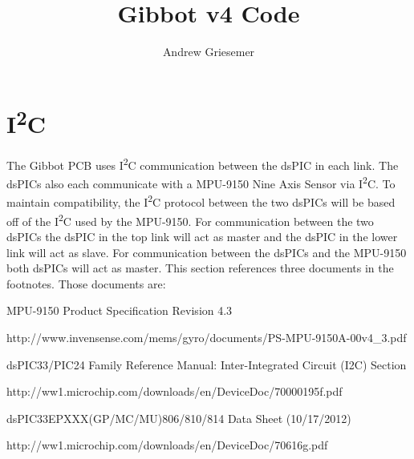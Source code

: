 \documentclass{article}
\begin{document}
\title{Gibbot v4 Code}
\author{Andrew Griesemer}
\maketitle
\section{I\textsuperscript{2}C}
The Gibbot PCB uses I\textsuperscript{2}C communication between the dsPIC in each link. The dsPICs also each communicate with a MPU-9150 Nine Axis Sensor via I\textsuperscript{2}C. To maintain compatibility, the I\textsuperscript{2}C protocol between the two dsPICs will be based off of the I\textsuperscript{2}C used by the MPU-9150. For communication between the two dsPICs the dsPIC in the top link will act as master and the dsPIC in the lower link will act as slave. For communication between the dsPICs and the MPU-9150 both dsPICs will act as master. This section references three documents in the footnotes. Those documents are:
\begin{description}
\item{MPU-9150 Product Specification Revision 4.3}

http://www.invensense.com/mems/gyro/documents/PS-MPU-9150A-00v4\_3.pdf
\item{dsPIC33/PIC24 Family Reference Manual: Inter-Integrated Circuit (I2C) Section}

http://ww1.microchip.com/downloads/en/DeviceDoc/70000195f.pdf
\item{dsPIC33EPXXX(GP/MC/MU)806/810/814 Data Sheet (10/17/2012)}

http://ww1.microchip.com/downloads/en/DeviceDoc/70616g.pdf
\end{description}
\end{document}
